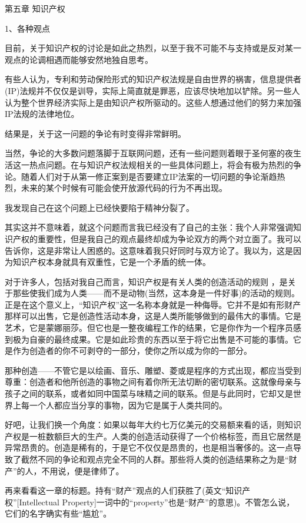 第五章 知识产权

 
1、各种观点

目前，关于知识产权的讨论是如此之热烈，以至于我不可能不与支持或是反对某一观点的论调相遇而能够安然地独自思考。

有些人认为，专利和劳动保险形式的知识产权法规是自由世界的祸害，信息提供者(IP)法规并不仅仅是训导，实际上简直就是罪恶，应该尽快地加以铲除。另一些人认为整个世界经济实际上是由知识产权所驱动的。这些人想通过他们的努力来加强IP法规的法律地位。

结果是，关于这一问题的争论有时变得非常鲜明。

当然，争论的大多数问题落脚于互联网问题，还有一些问题则着眼于圣何塞的夜生活这一热点问题。在与知识产权法规相关的一些具体问题上，将会有极为热烈的争论。随着人们对于从第一修正案到是否要建立IP法案的一切问题的争论渐趋热烈，未来的某个时候有可能会使开放源代码的行为不再出现。

我发现自己在这个问题上已经快要陷于精神分裂了。

其实这并不意味着，就这个问题而言我已经没有了自己的主张：我个人非常强调知识产权的重要性，但是我自己的观点最终却成为争论双方的两个对立面了。我可以告诉你，这是非常让人困惑的。这意味着我只好同时与双方论了。我以为，这是因为知识产权本身就具有双重性，它是一个矛盾的统一体。

对于许多人，包括对我自己而言，知识产权是有关人类的创造活动的规则 ，是关于那些使我们成为人类——而不是动物(当然，这本身是一件好事)的活动的规则。正是在这个意义上，“知识产权”这一名称本身就是一种侮辱。它并不是如有形财产那样可以出售，它是创造性活动本身，这是人类所能够做到的最伟大的事情。它是艺术，它是蒙娜丽莎。但它也是一整夜编程工作的结果，它是你作为一个程序员感到极为自豪的最终成果。它是如此珍贵的东西以至于将它出售是不可能的事情。它是作为创造者的你不可剥夺的一部分，使你之所以成为你的一部分。

那种创造——不管它是以绘画、音乐、雕塑、菱或是程序的方式出现，都应当受到尊重：创造者和他所创造的事物之间有着你所无法切断的密切联系。这就像母亲与孩子之间的联系，或者如同中国菜与味精之间的联系。但是与此同时，它却又是世界上每一个人都应当分享的事物，因为它是属于人类共同的。

好吧，让我们换一个角度：如果以每年大约七万亿美元的交易额来看的话，则知识产权是一桩数额巨大的生产。人类的创造活动获得了一个价格标签，而且它居然是异常昂贵的。创造是稀有的，于是它不仅仅是昂贵的，也是相当奢侈的。这一点导致了截然不同的争论和观点完全不同的人群。那些将人类的创造结果称之为是“财产”的人，不用说，便是律师了。

再来看看这一章的标题。持有“财产”观点的人们获胜了(英文“知识产权”[Intellectual Property]一词中的“property”也是“财产”的意思)。不管怎么说，它们的名字确实有些“尴尬”。


